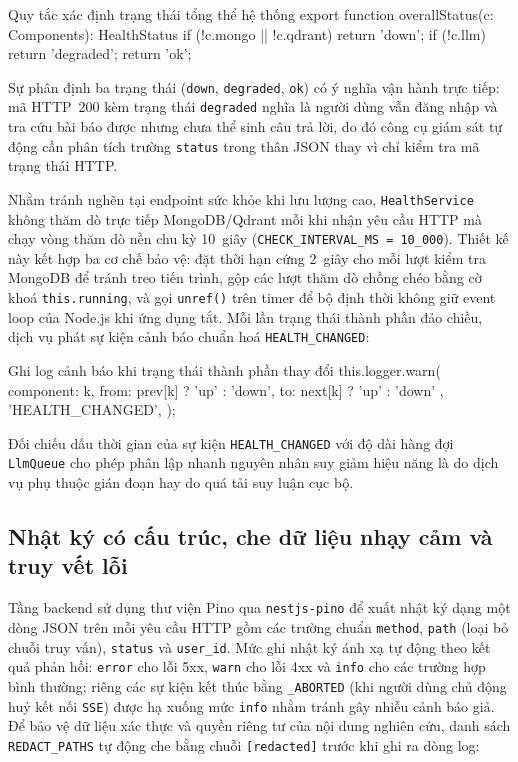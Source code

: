 \begin{tsbox}{Quy tắc xác định trạng thái tổng thể hệ thống}
export function overallStatus(c: Components): HealthStatus {
  if (!c.mongo || !c.qdrant) return 'down';
  if (!c.llm) return 'degraded';
  return 'ok';
}
\end{tsbox}

Sự phân định ba trạng thái (\texttt{down}, \texttt{degraded}, \texttt{ok}) có ý nghĩa vận hành trực tiếp: mã HTTP~200 kèm trạng thái \texttt{degraded} nghĩa là người dùng vẫn đăng nhập và tra cứu bài báo được nhưng chưa thể sinh câu trả lời, do đó công cụ giám sát tự động cần phân tích trường \texttt{status} trong thân JSON thay vì chỉ kiểm tra mã trạng thái HTTP.

Nhằm tránh nghẽn tại endpoint sức khỏe khi lưu lượng cao, \texttt{HealthService} không thăm dò trực tiếp MongoDB/Qdrant mỗi khi nhận yêu cầu HTTP mà chạy vòng thăm dò nền chu kỳ 10~giây (\texttt{CHECK\_\allowbreak{}INTERVAL\_\allowbreak{}MS = 10\_\allowbreak{}000}). Thiết kế này kết hợp ba cơ chế bảo vệ: đặt thời hạn cứng 2~giây cho mỗi lượt kiểm tra MongoDB để tránh treo tiến trình, gộp các lượt thăm dò chồng chéo bằng cờ khoá \texttt{this.\allowbreak{}running}, và gọi \texttt{unref()} trên timer để bộ định thời không giữ event loop của Node.js khi ứng dụng tắt. Mỗi lần trạng thái thành phần đảo chiều, dịch vụ phát sự kiện cảnh báo chuẩn hoá \texttt{HEALTH\_\allowbreak{}CHANGED}:

\begin{tsbox}{Ghi log cảnh báo khi trạng thái thành phần thay đổi}
this.logger.warn(
  { component: k, from: prev[k] ? 'up' : 'down', to: next[k] ? 'up' : 'down' },
  'HEALTH_CHANGED',
);
\end{tsbox}

Đối chiếu dấu thời gian của sự kiện \texttt{HEALTH\_\allowbreak{}CHANGED} với độ dài hàng đợi \texttt{LlmQueue} cho phép phân lập nhanh nguyên nhân suy giảm hiệu năng là do dịch vụ phụ thuộc gián đoạn hay do quá tải suy luận cục bộ.

\subsection{Nhật ký có cấu trúc, che dữ liệu nhạy cảm và truy vết lỗi}
\label{subsec:structured-logging}

Tầng backend sử dụng thư viện Pino qua \texttt{nestjs-\allowbreak{}pino} để xuất nhật ký dạng một dòng JSON trên mỗi yêu cầu HTTP gồm các trường chuẩn \texttt{method}, \texttt{path} (loại bỏ chuỗi truy vấn), \texttt{status} và \texttt{user\_\allowbreak{}id}. Mức ghi nhật ký ánh xạ tự động theo kết quả phản hồi: \texttt{error} cho lỗi 5xx, \texttt{warn} cho lỗi 4xx và \texttt{info} cho các trường hợp bình thường; riêng các sự kiện kết thúc bằng \texttt{\_\allowbreak{}ABORTED} (khi người dùng chủ động huỷ kết nối \texttt{SSE}) được hạ xuống mức \texttt{info} nhằm tránh gây nhiễu cảnh báo giả. Để bảo vệ dữ liệu xác thực và quyền riêng tư của nội dung nghiên cứu, danh sách \texttt{REDACT\_\allowbreak{}PATHS} tự động che bằng chuỗi \texttt{[redacted]} trước khi ghi ra dòng log:

